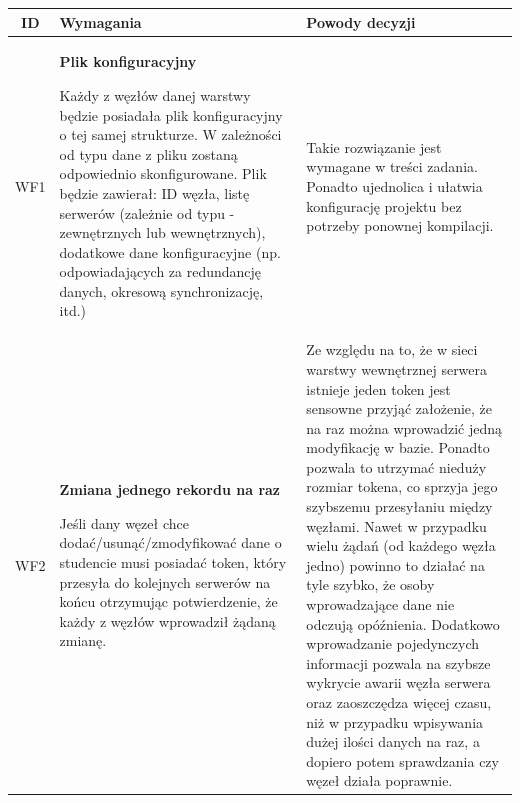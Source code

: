 \begin{tabularx}{\textwidth}{|c|X|X|}
\hline
\textbf{ID} & \textbf{Wymagania}  & \textbf{Powody decyzji} \\
\hline

\label{z:WF1} WF1 & \textbf{Plik konfiguracyjny}


Każdy z węzłów danej warstwy będzie posiadała plik konfiguracyjny o tej samej strukturze. W zależności od typu dane z pliku zostaną odpowiednio skonfigurowane. Plik będzie zawierał: ID węzła, listę serwerów (zależnie od typu - zewnętrznych lub wewnętrznych), dodatkowe dane konfiguracyjne (np. odpowiadających za redundancję danych, okresową synchronizację, itd.) &
Takie rozwiązanie jest wymagane w treści zadania. Ponadto ujednolica i ułatwia konfigurację projektu bez potrzeby ponownej kompilacji.\\
\hline

\label{z:WF2} WF2 &  \textbf{Zmiana jednego rekordu na raz }

Jeśli dany węzeł chce dodać/usunąć/zmodyfikować dane o studencie musi posiadać token, który przesyła do kolejnych serwerów na końcu otrzymując potwierdzenie, że każdy z węzłów wprowadził żądaną zmianę. & 
Ze względu na to, że w sieci warstwy wewnętrznej serwera istnieje jeden token jest sensowne przyjąć założenie, że na raz można wprowadzić jedną modyfikację w bazie. Ponadto pozwala to utrzymać nieduży rozmiar tokena, co sprzyja jego szybszemu przesyłaniu między węzłami. Nawet w przypadku wielu żądań (od każdego węzła jedno) powinno to działać na tyle szybko, że osoby wprowadzające dane nie odczują opóźnienia. Dodatkowo wprowadzanie pojedynczych informacji pozwala na szybsze wykrycie awarii węzła serwera oraz zaoszczędza więcej czasu, niż w przypadku wpisywania dużej ilości danych na raz, a dopiero potem sprawdzania czy węzeł działa poprawnie. \\
\hline

\end{tabularx}
\newpage
